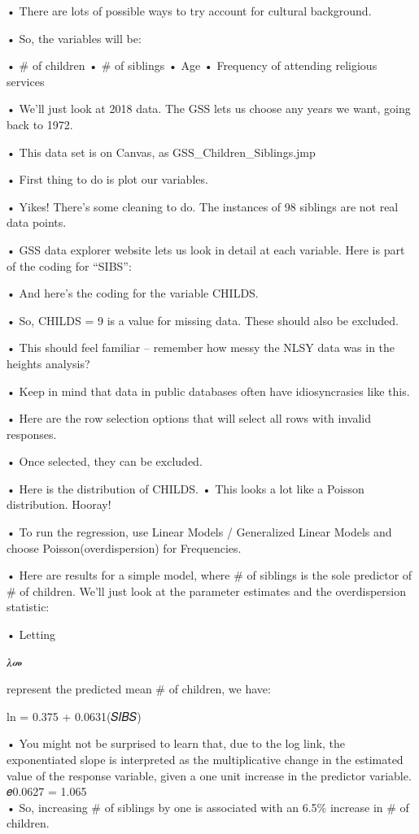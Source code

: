 \documentclass[
  letterpaper,
  DIV=11,
  numbers=noendperiod]{scrreprt}
\begin{document}
• There are lots of possible ways to try account for cultural
background.

• So, the variables will be:

• \# of children • \# of siblings • Age • Frequency of attending
religious services

• We'll just look at 2018 data. The GSS lets us choose any years we
want, going back to 1972.

• This data set is on Canvas, as GSS\_Children\_Siblings.jmp

• First thing to do is plot our variables.

• Yikes! There's some cleaning to do. The instances of 98 siblings are
not real data points.

• GSS data explorer website lets us look in detail at each variable.
Here is part of the coding for ``SIBS'':

• And here's the coding for the variable CHILDS.

• So, CHILDS = 9 is a value for missing data. These should also be
excluded.

• This should feel familiar -- remember how messy the NLSY data was in
the heights analysis?

• Keep in mind that data in public databases often have idiosyncrasies
like this.

• Here are the row selection options that will select all rows with
invalid responses.

• Once selected, they can be excluded.

• Here is the distribution of CHILDS. • This looks a lot like a Poisson
distribution. Hooray!

• To run the regression, use Linear Models / Generalized Linear Models
and choose Poisson(overdispersion) for Frequencies.

• Here are results for a simple model, where \# of siblings is the sole
predictor of \# of children. We'll just look at the parameter estimates
and the overdispersion statistic:

• Letting

𝜆መ

represent the predicted mean \# of children, we have:

ln = 0.375 + 0.0631(𝑆𝐼𝐵𝑆)

• You might not be surprised to learn that, due to the log link, the
exponentiated slope is interpreted as the multiplicative change in the
estimated value of the response variable, given a one unit increase in
the predictor variable. 𝑒0.0627 = 1.065\\
• So, increasing \# of siblings by one is associated with an 6.5\%
increase in \# of children.
\end{document}
